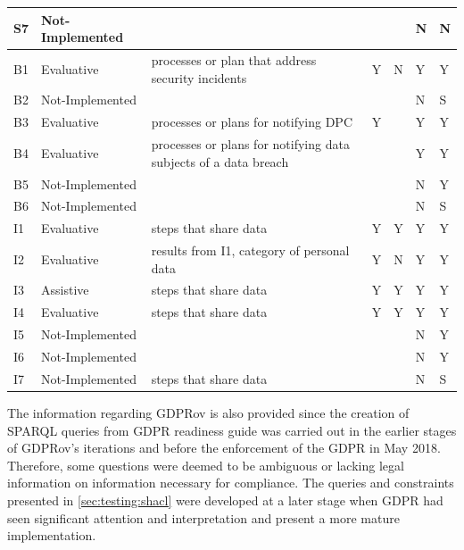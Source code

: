 \begin{center}
\begin{tabularx}{\textwidth}{|l|l|X|l|l|l|l|}
S7 & Not-Implemented &  &  &  & N & N \\ \hline
B1 & Evaluative & processes or plan that address security incidents & Y & N & Y & Y \\ \hline
B2 & Not-Implemented &  &  &  & N & S \\ \hline
B3 & Evaluative & processes or plans for notifying DPC & Y &  & Y & Y \\ \hline
B4 & Evaluative & processes or plans for notifying data subjects of a data breach &  &  & Y & Y \\ \hline
B5 & Not-Implemented &  &  &  & N & Y \\ \hline
B6 & Not-Implemented &  &  &  & N & S \\ \hline
I1 & Evaluative & steps that share data & Y & Y & Y & Y \\ \hline
I2 & Evaluative & results from I1, category of personal data & Y & N & Y & Y \\ \hline
I3 & Assistive & steps that share data & Y & Y & Y & Y \\ \hline
I4 & Evaluative & steps that share data & Y & Y & Y & Y \\ \hline
I5 & Not-Implemented &  &  &  & N & Y \\ \hline
I6 & Not-Implemented &  &  &  & N & Y \\ \hline
I7 & Not-Implemented & steps that share data &  &  & N & S \\ \hline
\end{tabularx}
\end{center}

The information regarding GDPRov is also provided since the creation of SPARQL queries from GDPR readiness guide was carried out in the earlier stages of GDPRov's iterations and before the enforcement of the GDPR in May 2018. Therefore, some questions were deemed to be ambiguous or lacking legal information on information necessary for compliance.
The queries and constraints presented in \autoref{sec:testing:shacl} were developed at a later stage when GDPR had seen significant attention and interpretation and present a more mature implementation.

